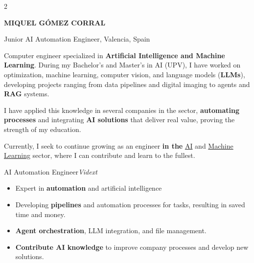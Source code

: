 \documentclass{miquelcv}
\begin{document}
\setlength{\columnsep}{0.95cm}
\begin{paracol}{2}


{\color{cvdarkblue}\Huge\bfseries MIQUEL GÓMEZ CORRAL}

\vspace{4pt}
{\color{cvblue}\large Junior AI Automation Engineer, Valencia, Spain}

\vspace{8pt}
{\small
Computer engineer specialized in \textbf{Artificial Intelligence and Machine Learning}. During my
Bachelor's and Master's in AI (UPV), I have worked on optimization, machine learning,
computer vision, and language models (\textbf{LLMs}), developing projects ranging from data
pipelines and digital imaging to agents and \textbf{RAG} systems.

\vspace{4pt}
I have applied this knowledge in several companies in the sector, \textbf{automating processes}
and integrating \textbf{AI solutions} that deliver real value, proving the strength of my education.

\vspace{4pt}
Currently, I seek to continue growing as an engineer \textbf{in the} \underline{AI} and
\underline{Machine Learning} sector, where I can contribute and learn to the fullest.
}

\vspace{4pt plus 1fill}

\newtimeline

%
  {AI Automation Engineer}{\textit{Vidext}}%
  {\begin{itemize}[nosep, left=0pt]
    \item Expert in \textbf{automation} and artificial intelligence
    \item Developing \textbf{pipelines} and automation processes for tasks, resulting in saved time and money.
    \item \textbf{Agent orchestration}, LLM integration, and file management.
    \item \textbf{Contribute AI knowledge} to improve company processes and develop new solutions.
   \end{itemize}
   }


\end{paracol}
\end{document}
